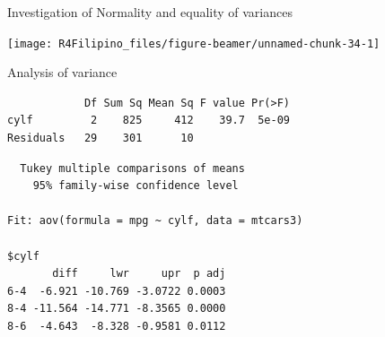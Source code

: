 \begin{frame}[fragile]{Investigation of Normality and equality of
variances}

\begin{Shaded}
\begin{Highlighting}[]
\NormalTok{(}\OperatorTok{+}\StringTok{ }\NormalTok{()}
\end{Highlighting}
\end{Shaded}

\begin{center}\texttt{[image: R4Filipino\_files/figure-beamer/unnamed-chunk-34-1]} \end{center}

\end{frame}

\begin{frame}[fragile]{Analysis of variance}

\begin{Shaded}
\begin{Highlighting}[]
\OperatorTok{$}\StringTok{ }\OperatorTok{$}
\StringTok{ }\OperatorTok{~}
\end{Highlighting}
\end{Shaded}

\begin{verbatim}
            Df Sum Sq Mean Sq F value Pr(>F)
cylf         2    825     412    39.7  5e-09
Residuals   29    301      10               
\end{verbatim}

\begin{Shaded}
\begin{Highlighting}[]
\NormalTok{)}
\end{Highlighting}
\end{Shaded}

\begin{verbatim}
  Tukey multiple comparisons of means
    95% family-wise confidence level

Fit: aov(formula = mpg ~ cylf, data = mtcars3)

$cylf
       diff     lwr     upr  p adj
6-4  -6.921 -10.769 -3.0722 0.0003
8-4 -11.564 -14.771 -8.3565 0.0000
8-6  -4.643  -8.328 -0.9581 0.0112
\end{verbatim}

\end{frame}

